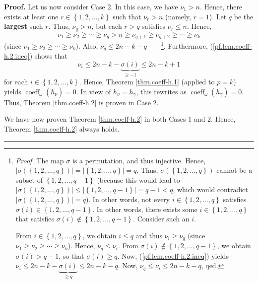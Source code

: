 \documentclass[numbers=enddot,12pt,final,onecolumn,notitlepage]{scrartcl}%
\theoremstyle{definition}
\newenvironment{proof}[1][Proof]{\noindent\textbf{#1.} }{\ \rule{0.5em}{0.5em}}
\begin{document}
\begin{proof}
Let us now consider Case 2. In this case, we have $\nu_{1}>n$. Hence, there
exists at least one $r\in\left\{  1,2,\ldots,k\right\}  $ such that $\nu
_{r}>n$ (namely, $r=1$). Let $q$ be the \textbf{largest} such $r$. Thus,
$\nu_{q}>n$, but each $r>q$ satisfies $\nu_{r}\leq n$. Hence,%
\[
\nu_{1}\geq\nu_{2}\geq\cdots\geq\nu_{q}>n\geq\nu_{q+1}\geq\nu_{q+2}\geq
\cdots\geq\nu_{k}%
\]
(since $\nu_{1}\geq\nu_{2}\geq\cdots\geq\nu_{k}$). Also, $\nu_{q}\leq
2n-k-q$\ \ \ \ \footnote{\textit{Proof.} The map $\sigma$ is a permutation,
and thus injective. Hence, $\left\vert \sigma\left(  \left\{  1,2,\ldots
,q\right\}  \right)  \right\vert =\left\vert \left\{  1,2,\ldots,q\right\}
\right\vert =q$. Thus, $\sigma\left(  \left\{  1,2,\ldots,q\right\}  \right)
$ cannot be a subset of $\left\{  1,2,\ldots,q-1\right\}  $ (because this
would lead to $\left\vert \sigma\left(  \left\{  1,2,\ldots,q\right\}
\right)  \right\vert \leq\left\vert \left\{  1,2,\ldots,q-1\right\}
\right\vert =q-1<q$, which would contradict $\left\vert \sigma\left(  \left\{
1,2,\ldots,q\right\}  \right)  \right\vert =q$). In other words, not every
$i\in\left\{  1,2,\ldots,q\right\}  $ satisfies $\sigma\left(  i\right)
\in\left\{  1,2,\ldots,q-1\right\}  $. In other words, there exists some
$i\in\left\{  1,2,\ldots,q\right\}  $ that satisfies $\sigma\left(  i\right)
\notin\left\{  1,2,\ldots,q-1\right\}  $. Consider such an $i$.
\par
From $i\in\left\{  1,2,\ldots,q\right\}  $, we obtain $i\leq q$ and thus
$\nu_{i}\geq\nu_{q}$ (since $\nu_{1}\geq\nu_{2}\geq\cdots\geq\nu_{k}$). Hence,
$\nu_{q}\leq\nu_{i}$. From $\sigma\left(  i\right)  \notin\left\{
1,2,\ldots,q-1\right\}  $, we obtain $\sigma\left(  i\right)  >q-1$, so that
$\sigma\left(  i\right)  \geq q$. Now, (\ref{pf.lem.coeff-h.2.ineq}) yields
$\nu_{i}\leq2n-k-\underbrace{\sigma\left(  i\right)  }_{\geq q}\leq2n-k-q$.
Now, $\nu_{q}\leq\nu_{i}\leq2n-k-q$, qed.}. Furthermore,
(\ref{pf.lem.coeff-h.2.ineq}) shows that%
\[
\nu_{i}\leq2n-k-\underbrace{\sigma\left(  i\right)  }_{\geq-1}\leq2n-k+1
\]
for each $i\in\left\{  1,2,\ldots,k\right\}  $. Hence, Theorem
\ref{thm.coeff-h.1} (applied to $p=k$) yields $\operatorname*{coeff}%
\nolimits_{\omega}\left(  \overline{h_{\nu}}\right)  =0$. In view of $h_{\nu
}=h_{\gamma}$, this rewrites as $\operatorname*{coeff}\nolimits_{\omega
}\left(  \overline{h_{\gamma}}\right)  =0$. Thus, Theorem \ref{thm.coeff-h.2}
is proven in Case 2.

We have now proven Theorem \ref{thm.coeff-h.2} in both Cases 1 and 2. Hence,
Theorem \ref{thm.coeff-h.2} always holds.
\end{proof}
\end{document}
